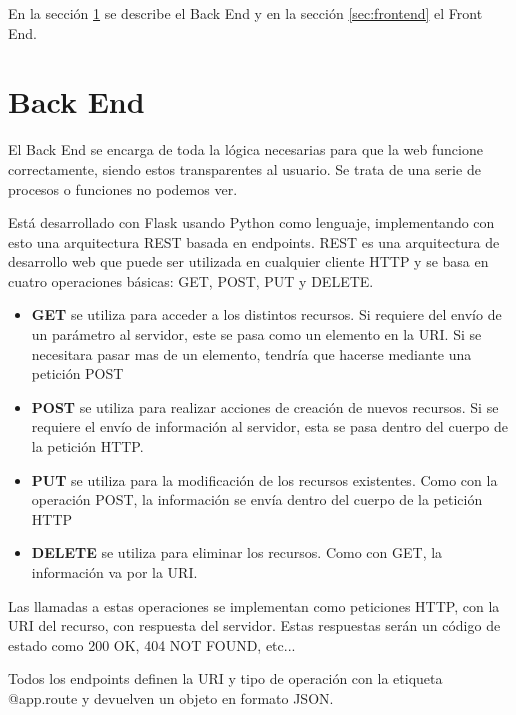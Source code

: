 En la sección  \ref{sec:backend} se describe el Back End y en la sección \ref{sec:frontend} el Front End.

\section{Back End}\label{sec:backend}

El Back End se encarga de toda la lógica necesarias para que la web funcione correctamente, siendo estos transparentes al usuario. Se trata de una serie de procesos o funciones no podemos ver.

Está desarrollado con Flask usando Python como lenguaje, implementando con esto una arquitectura REST basada en endpoints.
REST es una arquitectura de desarrollo web que puede ser utilizada en cualquier cliente HTTP y se basa en cuatro operaciones básicas: GET, POST, PUT y DELETE.
\begin{itemize}
	\item \textbf{GET} se utiliza para acceder a los distintos recursos. Si requiere del envío de un parámetro al servidor, este se pasa como un elemento en la URI. Si se necesitara pasar mas de un elemento, tendría que hacerse mediante una petición POST
	
	\item \textbf{POST} se utiliza para realizar acciones de creación de nuevos recursos. Si se requiere el envío de información al servidor, esta se pasa dentro del cuerpo de la petición HTTP.
	
	\item \textbf{PUT} se utiliza para la modificación de los recursos existentes. Como con la operación POST, la información se envía dentro del cuerpo de la petición HTTP
	
	\item \textbf{DELETE} se utiliza para eliminar los recursos. Como con GET, la información va por la URI.
\end{itemize}
Las llamadas a estas operaciones se implementan como peticiones HTTP, con la URI del recurso, con respuesta del servidor. Estas respuestas serán un código de estado como 200 OK, 404 NOT FOUND, etc...

Todos los endpoints definen la URI y tipo de operación con la etiqueta  @app.route y devuelven un objeto en formato JSON.

